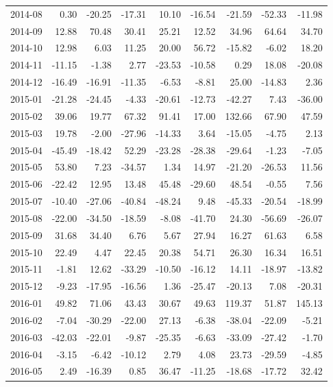 \begin{table}[ht]
\begin{tabular}{lrrrrrrrr}
  2014-08 & 0.30 & -20.25 & -17.31 & 10.10 & -16.54 & -21.59 & -52.33 & -11.98 \\ 
  2014-09 & 12.88 & 70.48 & 30.41 & 25.21 & 12.52 & 34.96 & 64.64 & 34.70 \\ 
  2014-10 & 12.98 & 6.03 & 11.25 & 20.00 & 56.72 & -15.82 & -6.02 & 18.20 \\ 
  2014-11 & -11.15 & -1.38 & 2.77 & -23.53 & -10.58 & 0.29 & 18.08 & -20.08 \\ 
  2014-12 & -16.49 & -16.91 & -11.35 & -6.53 & -8.81 & 25.00 & -14.83 & 2.36 \\ 
  2015-01 & -21.28 & -24.45 & -4.33 & -20.61 & -12.73 & -42.27 & 7.43 & -36.00 \\ 
  2015-02 & 39.06 & 19.77 & 67.32 & 91.41 & 17.00 & 132.66 & 67.90 & 47.59 \\ 
  2015-03 & 19.78 & -2.00 & -27.96 & -14.33 & 3.64 & -15.05 & -4.75 & 2.13 \\ 
  2015-04 & -45.49 & -18.42 & 52.29 & -23.28 & -28.38 & -29.64 & -1.23 & -7.05 \\ 
  2015-05 & 53.80 & 7.23 & -34.57 & 1.34 & 14.97 & -21.20 & -26.53 & 11.56 \\ 
  2015-06 & -22.42 & 12.95 & 13.48 & 45.48 & -29.60 & 48.54 & -0.55 & 7.56 \\ 
  2015-07 & -10.40 & -27.06 & -40.84 & -48.24 & 9.48 & -45.33 & -20.54 & -18.99 \\ 
  2015-08 & -22.00 & -34.50 & -18.59 & -8.08 & -41.70 & 24.30 & -56.69 & -26.07 \\ 
  2015-09 & 31.68 & 34.40 & 6.76 & 5.67 & 27.94 & 16.27 & 61.63 & 6.58 \\ 
  2015-10 & 22.49 & 4.47 & 22.45 & 20.38 & 54.71 & 26.30 & 16.34 & 16.51 \\ 
  2015-11 & -1.81 & 12.62 & -33.29 & -10.50 & -16.12 & 14.11 & -18.97 & -13.82 \\ 
  2015-12 & -9.23 & -17.95 & -16.56 & 1.36 & -25.47 & -20.13 & 7.08 & -20.31 \\ 
  2016-01 & 49.82 & 71.06 & 43.43 & 30.67 & 49.63 & 119.37 & 51.87 & 145.13 \\ 
  2016-02 & -7.04 & -30.29 & -22.00 & 27.13 & -6.38 & -38.04 & -22.09 & -5.21 \\ 
  2016-03 & -42.03 & -22.01 & -9.87 & -25.35 & -6.63 & -33.09 & -27.42 & -1.70 \\ 
  2016-04 & -3.15 & -6.42 & -10.12 & 2.79 & 4.08 & 23.73 & -29.59 & -4.85 \\ 
  2016-05 & 2.49 & -16.39 & 0.85 & 36.47 & -11.25 & -18.68 & -17.72 & 32.42 \\ 

\end{tabular}
\end{table}
